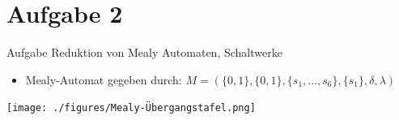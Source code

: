 
\section{Aufgabe 2}

\setcounter{exercise}{1}

%
\newcommand{\unsim}{\mathord{\sim}}

    \begin{frame}{Aufgabe \thesection}{Reduktion von Mealy Automaten, Schaltwerke}
      \begin{exercisenoinc}
        \begin{itemize}
          \item Mealy-Automat gegeben durch: $M = (\{0,1\}, \{0,1\}, \{s_1, ..., s_6\}, \{s_1\}, \delta, \lambda)$
        \end{itemize}
        \texttt{[image: ./figures/Mealy-Übergangstafel.png]}
      \end{exercisenoinc}
    \end{frame}

